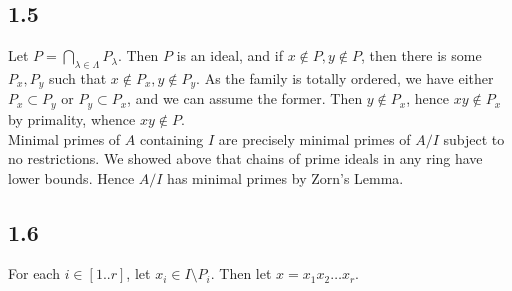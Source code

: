 \documentclass{article}
\theoremstyle{definition}
\begin{document}
\subsection*{1.5}

Let $P = \bigcap_{\lambda \in \Lambda} P_{\lambda}$. Then $P$ is an ideal, and
if $x \not \in P, y \not \in P$, then there is some $P_x, P_y$ such that $x
\not \in P_x, y \not \in P_y$. As the family is totally ordered, we have either
$P_x \subset P_y$ or $P_y \subset P_x$, and we can assume the former. Then $y
\not \in P_x$, hence $xy \not \in P_x$ by primality, whence $xy \not \in P$. \\

Minimal primes of $A$ containing $I$ are precisely minimal primes of $A/I$
subject to no restrictions. We showed above that chains of prime ideals in any
ring have lower bounds. Hence $A/I$ has minimal primes by Zorn's Lemma.

\subsection*{1.6}

For each $i \in [1..r]$, let $x_i \in I \setminus P_i$. Then let $x =
x_1x_2\ldots x_r$.
\end{document}
